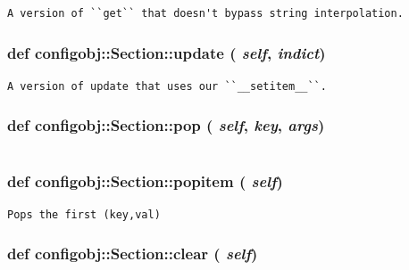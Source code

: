 \footnotesize\begin{verbatim}A version of ``get`` that doesn't bypass string interpolation.\end{verbatim}
\normalsize
\subsubsection{\setlength{\rightskip}{0pt plus 5cm}def configobj::Section::update ( {\em self},  {\em indict})}\label{classconfigobj_1_1Section_87a92164860a49f6e72851e87d92cc80}




\footnotesize\begin{verbatim}
A version of update that uses our ``__setitem__``.
\end{verbatim}
\normalsize
\subsubsection{\setlength{\rightskip}{0pt plus 5cm}def configobj::Section::pop ( {\em self},  {\em key},  {\em args})}\label{classconfigobj_1_1Section_0533bffcf9d10ef5d4520ce651e38665}




\footnotesize\begin{verbatim}\end{verbatim}
\normalsize
\subsubsection{\setlength{\rightskip}{0pt plus 5cm}def configobj::Section::popitem ( {\em self})}\label{classconfigobj_1_1Section_35e7d107441c970bcec696d6e2169f70}




\footnotesize\begin{verbatim}Pops the first (key,val)\end{verbatim}
\normalsize
\subsubsection{\setlength{\rightskip}{0pt plus 5cm}def configobj::Section::clear ( {\em self})}\label{classconfigobj_1_1Section_1688b24ab8ce906c658e9b97322e1df3}





